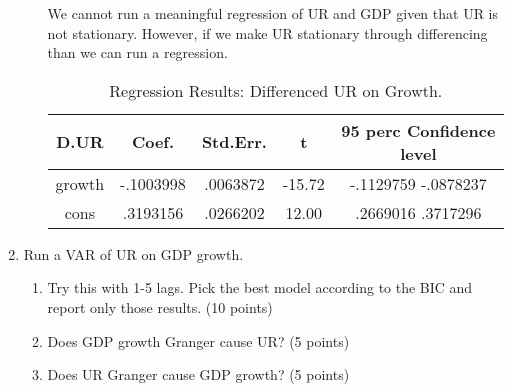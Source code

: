 \documentclass{article}
\begin{document}
\begin{enumerate}
\begin{enumerate}
We cannot run a meaningful regression of UR and GDP given that UR is not stationary.  However, if we make UR stationary through differencing than we can run a regression.

\begin{table}[h!]
  \begin{center}
    \caption{Regression Results:  Differenced UR on Growth.}
    \label{tab:table1}
    \begin{tabular}{c|c|c|c|c}
      D.UR & Coef. & Std.Err. & t & 95 perc Confidence level\\
      \hline
      growth  & -.1003998 & .0063872 & -15.72 & -.1129759	-.0878237 \\
      cons & .3193156 & .0266202 & 12.00 & .2669016	.3717296 \\
    \end{tabular}
  \end{center}
\end{table}
						
\end{enumerate}
\item Run a VAR of UR on GDP growth.
\begin{enumerate}
\item Try this with 1-5 lags. Pick the best model according to the BIC and report only those results. (10 points)
\item Does GDP growth Granger cause UR? (5 points)
\item Does UR Granger cause GDP growth? (5 points)
\end{enumerate}
\end{enumerate}
\end{document}
